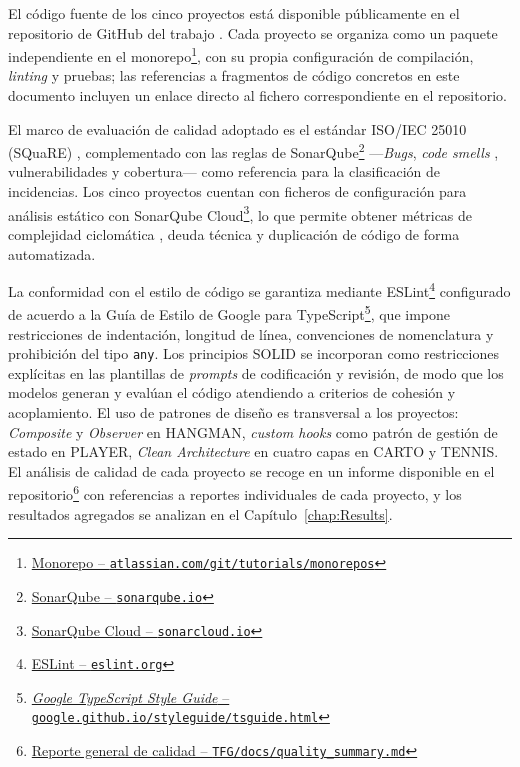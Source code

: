 El código fuente de los cinco proyectos está disponible públicamente en el repositorio de GitHub del trabajo \cite{URL::TFG}. Cada proyecto se organiza como un paquete independiente en el monorepo\footnote{\href{https://www.atlassian.com/git/tutorials/monorepos}{Monorepo -- \texttt{atlassian.com/git/tutorials/monorepos}}}, con su propia configuración de compilación, \textit{linting} y pruebas; las referencias a fragmentos de código concretos en este documento incluyen un enlace directo al fichero correspondiente en el repositorio.    

El marco de evaluación de calidad adoptado es el estándar ISO/IEC 25010 (SQuaRE) \cite{ISO25010:2023}, complementado con las reglas de SonarQube\footnote{\href{https://sonarqube.io}{SonarQube -- \texttt{sonarqube.io}}} ---\textit{Bugs}, \textit{code smells} \cite{Fowler:1999:Refactoring}, vulnerabilidades y cobertura--- como referencia para la clasificación de incidencias. Los cinco proyectos cuentan con ficheros de configuración para análisis estático con SonarQube Cloud\footnote{\href{https://sonarcloud.io}{SonarQube Cloud -- \texttt{sonarcloud.io}}}, lo que permite obtener métricas de complejidad ciclomática \cite{McCabe:1976:Complexity}, deuda técnica y duplicación de código de forma automatizada. 

La conformidad con el estilo de código se garantiza mediante ESLint\footnote{\href{https://eslint.org/}{ESLint -- \texttt{eslint.org}}} configurado de acuerdo a la Guía de Estilo de Google para TypeScript\footnote{\href{https://google.github.io/styleguide/tsguide.html}{\textit{Google TypeScript Style Guide} -- \texttt{google.github.io/styleguide/tsguide.html}}}, que impone restricciones de indentación, longitud de línea, convenciones de nomenclatura y prohibición del tipo \texttt{any}. Los principios \ac{SOLID} \cite{Martin:2003:Agile} se incorporan como restricciones explícitas en las plantillas de \textit{prompts} de codificación y revisión, de modo que los modelos generan y evalúan el código atendiendo a criterios de cohesión y acoplamiento. El uso de patrones de diseño \cite{Gamma:1994:Design} es transversal a los proyectos: \textit{Composite} y \textit{Observer} en \ac{HANGMAN}, \textit{custom hooks} como patrón de gestión de estado en \ac{PLAYER}, \textit{Clean Architecture} en cuatro capas en \ac{CARTO} y \ac{TENNIS}. El análisis de calidad de cada proyecto se recoge en un informe disponible en el repositorio\footnote{\href{https://github.com/alu0101549491/TFG-Fabian-Gonzalez-Lence/blob/main/docs/quality_summary.md}{Reporte general de calidad -- \texttt{TFG/docs/quality\_summary.md}}} con referencias a reportes individuales de cada proyecto, y los resultados agregados se analizan en el Capítulo~\ref{chap:Results}.

